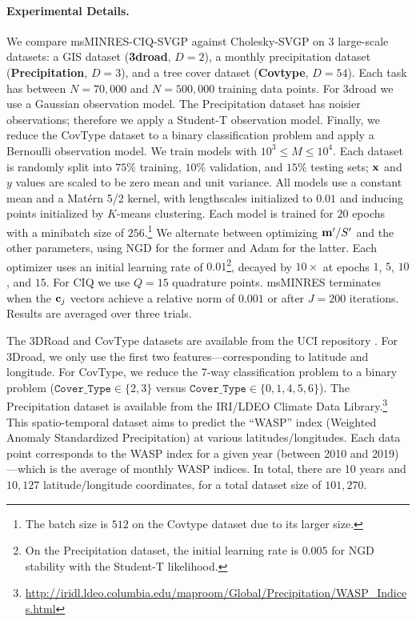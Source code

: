 \paragraph{Experimental Details.}
We compare msMINRES-CIQ-SVGP against Cholesky-SVGP on 3 large-scale datasets: a GIS dataset ({\bf 3droad}, $D=2$), a monthly precipitation dataset ({\bf Precipitation}, $D=3$), and a tree cover dataset ({\bf Covtype}, $D=54$).
Each task has between $N=70,\!000$ and $N=500,\!000$ training data points.
For 3droad we use a Gaussian observation model.
The Precipitation dataset has noisier observations; therefore we apply a Student-T observation model.
Finally, we reduce the CovType dataset to a binary classification problem and apply a Bernoulli observation model.
We train models with $ 10^3 \le M \le 10^4$.
Each dataset is randomly split into $75\%$ training, $10\%$ validation, and $15\%$ testing sets; $\mathbf{x}$ and $y$ values are scaled to be zero mean and unit variance.
All models use a constant mean and a Mat\'ern 5/2 kernel, with lengthscales initialized to $0.01$ and inducing points initialized by $K$-means clustering.
Each model is trained for $20$ epochs with a minibatch size of $256.$\footnote{
  The batch size is $512$ on the Covtype dataset due to its larger size.
}
We alternate between optimizing $\mathbf{m}'/S'$ and the other parameters, using NGD for the former and Adam \cite{kingma2014adam} for the latter.
Each optimizer uses an initial learning rate of $0.01$\footnote{
  On the Precipitation dataset, the initial learning rate is $0.005$ for NGD stability with the Student-T likelihood.
}, decayed by $10\times$ at epochs $1$, $5$, $10$, and $15$.
For CIQ we use $Q = 15$ quadrature points.
msMINRES terminates when the $\mathbf{c}_j$ vectors achieve a relative norm of $0.001$ or after $J=200$ iterations.
Results are averaged over three trials.

The 3DRoad and CovType datasets are available from the UCI repository \citep{asuncion2007uci}.
For 3Droad, we only use the first two features---corresponding to latitude and longitude.
For CovType, we reduce the 7-way classification problem to a binary problem ($\mathtt{Cover\_Type} \in \{ 2, 3\}$ versus $\mathtt{Cover\_Type} \in \{ 0, 1, 4, 5, 6 \}$).
The Precipitation dataset is available from the IRI/LDEO Climate Data Library.\footnote{
  \url{http://iridl.ldeo.columbia.edu/maproom/Global/Precipitation/WASP_Indices.html}
}
This spatio-temporal dataset aims to predict the ``WASP'' index (Weighted Anomaly Standardized Precipitation) at various latitudes/longitudes.
Each data point corresponds to the WASP index for a given year (between 2010 and 2019)---which is the average of monthly WASP indices.
In total, there are 10 years and $10,\!127$ latitude/longitude coordinates, for a total dataset size of $101,\!270$.


